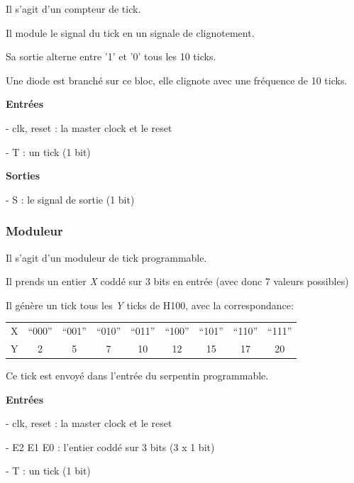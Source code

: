 \documentclass[10pt]{article}
\begin{document}
        Il s'agit d'un compteur de tick.
                
        Il module le signal du tick en un signale de clignotement.
        
        Sa sortie alterne entre '1' et '0' tous les 10 ticks.
        
        Une diode est branché sur ce bloc, elle clignote avec une fréquence de 10 ticks.
                
        \textbf{Entrées}
        
            - clk, reset : la master clock et le reset
            
            - T : un tick (1 bit)
                            
        \textbf{Sorties}
            
            - S : le signal de sortie (1 bit)
        
        \subsubsection{Moduleur}
        
        Il s'agit d'un moduleur de tick programmable.
                
        Il prends un entier \textit{X} coddé sur 3 bits en entrée (avec donc 7 valeurs possibles)
        
        Il génère un tick tous les \textit{Y} ticks de H100, avec la correspondance:
        
        \begin{table}[h]
            \centering
            \begin{tabular}{ccccccccc}
                   X & ``000'' & ``001'' & ``010'' & ``011'' & ``100'' & ``101'' & ``110'' & ``111'' \\
                   Y &    2    &    5    &    7    &    10   &    12   &   15    &   17    &    20   \\
            \end{tabular}
        \end{table}
        
        Ce tick est envoyé dans l'entrée du serpentin programmable.

        \textbf{Entrées}
        
            - clk, reset : la master clock et le reset

            - E2 E1 E0 : l'entier coddé sur 3 bits (3 x 1 bit)

            - T : un tick (1 bit)
                            
\end{document}
